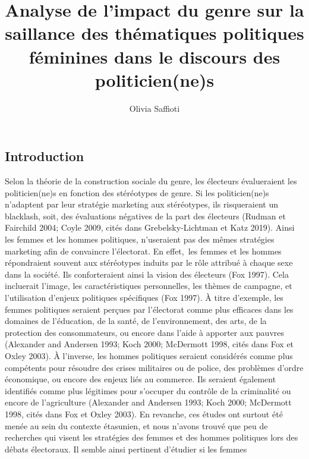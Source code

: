 \documentclass[
  letterpaper,
  DIV=11,
  numbers=noendperiod]{scrartcl}
\title{Analyse de l'impact du genre sur la saillance des thématiques
politiques féminines dans le discours des politicien(ne)s}
\author{Olivia Saffioti}
\date{}
\begin{document}
\maketitle
\ifdefined\Shaded\renewenvironment{Shaded}{\begin{tcolorbox}[frame hidden, sharp corners, interior hidden, borderline west={3pt}{0pt}{shadecolor}, boxrule=0pt, breakable, enhanced]}{\end{tcolorbox}}\fi

\hypertarget{introduction}{%
\subsection{Introduction}\label{introduction}}

Selon la théorie de la construction sociale du genre, les électeurs
évalueraient les politicien(ne)s en fonction des stéréotypes de genre.
Si les politicien(ne)s n'adaptent par leur stratégie marketing aux
stéréotypes, ils risqueraient un blacklash, soit, des évaluations
négatives de la part des électeurs (Rudman et Fairchild 2004; Coyle
2009, cités dans Grebelsky-Lichtman et Katz 2019). Ainsi les femmes et
les hommes politiques, n'useraient pas des mêmes stratégies marketing
afin de convaincre l'électorat. En effet,~les femmes et les hommes
répondraient souvent aux stéréotypes induits par le rôle attribué à
chaque sexe dans la société. Ils conforteraient ainsi la vision des
électeurs (Fox 1997). Cela incluerait l'image, les caractéristiques
personnelles, les thèmes de campagne, et l'utilisation d'enjeux
politiques spécifiques (Fox 1997). À titre d'exemple, les femmes
politiques seraient perçues par l'électorat comme plus efficaces dans
les domaines de l'éducation, de la santé, de l'environnement, des arts,
de la protection des consommateurs, ou encore dans l'aide à apporter aux
pauvres (Alexander and Andersen 1993; Koch 2000; McDermott 1998, cités
dans Fox et Oxley 2003). À l'inverse, les hommes politiques seraient
considérés comme plus compétents pour résoudre des crises militaires ou
de police, des problèmes d'ordre économique, ou encore des enjeux liés
au commerce. Ils seraient également identifiés comme plus légitimes pour
s'occuper du contrôle de la criminalité ou encore de l'agriculture
(Alexander and Andersen 1993; Koch 2000; McDermott 1998, cités dans Fox
et Oxley 2003). En revanche, ces études ont surtout été menée au sein du
contexte étasunien, et nous n'avons trouvé que peu de recherches qui
visent les stratégies des femmes et des hommes politiques lors des
débats électoraux. Il semble ainsi pertinent d'étudier si les femmes
\end{document}
